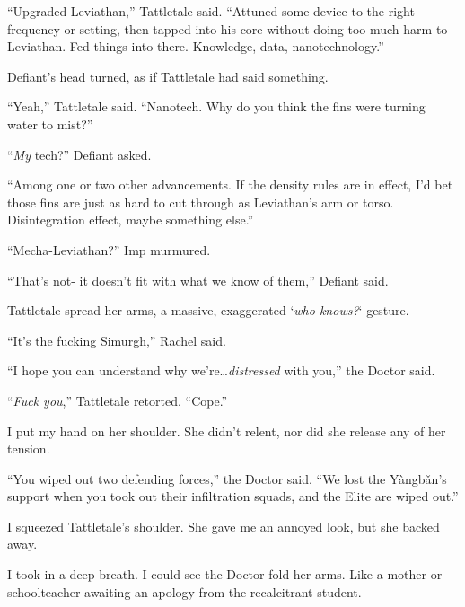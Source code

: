 ``Upgraded Leviathan,'' Tattletale said.  ``Attuned some device to the right frequency or setting, then tapped into his core without doing too much harm to Leviathan.  Fed things into there.  Knowledge, data, nanotechnology.''



Defiant's head turned, as if Tattletale had said something.



``Yeah,'' Tattletale said.  ``Nanotech.  Why do you think the fins were turning water to mist?''



``\emph{My} tech?''  Defiant asked.



``Among one or two other advancements.  If the density rules are in effect, I'd bet those fins are just as hard to cut through as Leviathan's arm or torso.  Disintegration effect, maybe something else.''



``Mecha-Leviathan?'' Imp murmured.



``That's not- it doesn't fit with what we know of them,'' Defiant said.



Tattletale spread her arms, a massive, exaggerated `\emph{who knows?}` gesture.



``It's the fucking Simurgh,'' Rachel said.



``I hope you can understand why we're\ldots \emph{distressed} with you,'' the Doctor said.



``\emph{Fuck you},'' Tattletale retorted.  ``Cope.''



I put my hand on her shoulder.  She didn't relent, nor did she release any of her tension.



``You wiped out two defending forces,'' the Doctor said.  ``We lost the Y\`{a}ngb\v{a}n's support when you took out their infiltration squads, and the Elite are wiped out.''



I squeezed Tattletale's shoulder.  She gave me an annoyed look, but she backed away.



I took in a deep breath.  I could see the Doctor fold her arms.  Like a mother or schoolteacher awaiting an apology from the recalcitrant student.




